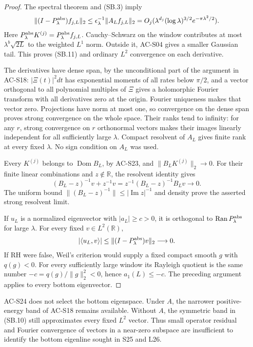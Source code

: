 \begin{proof}
The spectral theorem and (SB.3) imply
\[
 \|(I-P_\lambda^{\rm abs})f_{j,L}\|_2
 \leq\epsilon_\lambda^{-1}\|A_Lf_{j,L}\|_2
 =O_j(\lambda^{d_j}(\log\lambda)^{3/2}
                                      e^{-\pi\lambda^2/2}).
\]
Here \(P_\lambda^{\rm abs}K^{(j)}
      =P_\lambda^{\rm abs}f_{j,L}\).
Cauchy--Schwarz on the window contributes at most
\(\lambda^b\sqrt{2L}\) to the weighted \(L^1\) norm.
Outside it, AC-S04 gives a smaller Gaussian tail.  This proves
(SB.11) and ordinary \(L^2\) convergence on each derivative.

The derivatives have dense span, by the unconditional part of the
argument in AC-S18: \(|\Xi(t)|^2dt\) has exponential moments of all
rates below \(\pi/2\), and a vector orthogonal to all polynomial
multiples of \(\Xi\) gives a holomorphic Fourier transform with all
derivatives zero at the origin.  Fourier uniqueness makes that
vector zero.  Projections have norm at most one, so convergence on
the dense span proves strong convergence on the whole space.
Their ranks tend to infinity: for any \(r\), strong convergence on
\(r\) orthonormal vectors makes their images linearly independent
for all sufficiently large \(\lambda\).
Compact resolvent of \(A_L\) gives finite rank at every fixed
\(\lambda\).  No sign condition on \(A_L\) was used.

Every \(K^{(j)}\) belongs to \(\operatorname{Dom}B_L\), by AC-S23,
and \(\|B_LK^{(j)}\|_2\to0\).  For their finite linear combinations
and \(z\notin\mathbb R\), the resolvent identity gives
\[
 (B_L-z)^{-1}v+z^{-1}v
      =z^{-1}(B_L-z)^{-1}B_Lv\longrightarrow0 .
\]
The uniform bound \(\|(B_L-z)^{-1}\|\leq|\operatorname{Im}z|^{-1}\)
and density prove the asserted strong resolvent limit.

If \(u_L\) is a normalized eigenvector with
\(|a_L|\geq c>0\), it is orthogonal to
\(\operatorname{Ran}P_\lambda^{\rm abs}\) for large \(\lambda\).
For every fixed \(v\in L^2(\mathbb R)\),
\[
 |\langle u_L,v\rangle|
 \leq\|(I-P_\lambda^{\rm abs})v\|_2\longrightarrow0 .
\]
If RH were false, Weil's criterion would supply a fixed compact
smooth \(g\) with \(q(g)<0\).  For every sufficiently large window
its Rayleigh quotient is the same number
\(-c=q(g)/\|g\|_2^2<0\), hence \(a_1(L)\leq-c\).
The preceding argument applies to every bottom eigenvector.
\end{proof}

AC-S24 does not select the bottom eigenspace.  Under \(A\), the
narrower positive-energy band of AC-S18 remains available.  Without
\(A\), the symmetric band in (SB.10) still approximates every fixed
\(L^2\) vector.  Thus small operator residual and Fourier convergence
of vectors in a near-zero subspace are insufficient to identify
the bottom eigenline sought in S25 and L26.


